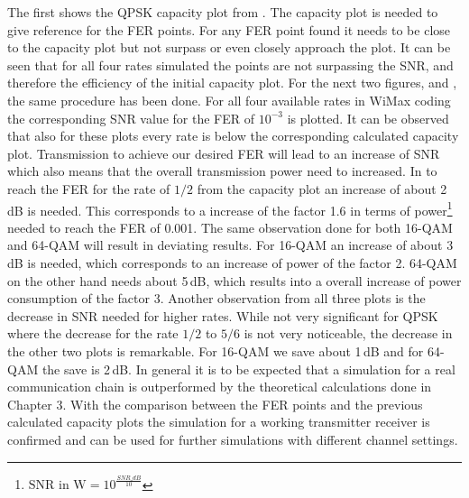 \newpage
The first  shows the QPSK capacity plot from . The capacity plot is needed to give reference for the \gls{FER} points. For any \gls{FER} point found it needs to be close to the capacity plot but not surpass or even closely approach the plot. It can be seen that for all four rates simulated the points are not surpassing the \gls{SNR}, and therefore the efficiency of the initial  capacity plot.
\newline
For the next two figures,  and , the same procedure has been done. For all four available rates in WiMax coding the corresponding SNR value for the \gls{FER} of $10^{-3}$ is plotted. It can be observed that also for these plots every rate is below the corresponding calculated capacity plot. Transmission to achieve our desired \gls{FER} will lead to an increase of \gls{SNR} which also means that the overall transmission power need to increased. In  to reach the \gls{FER} for the rate of $1/2$ from the capacity plot an increase of about 2\,dB is needed. This corresponds to a increase of the factor 1.6 in terms of power\footnote{$\textrm{SNR in W} = 10^{\frac{SNR\_dB}{10}}$} needed to reach the \gls{FER} of 0.001. The same observation done for both 16-QAM and 64-QAM will result in deviating results. For 16-QAM an increase of about 3\,dB is needed, which corresponds to an increase of power of the factor 2. 64-QAM on the other hand needs about 5\,dB, which results into a overall increase of power consumption of the factor 3.
\newline
Another observation from all three plots is the decrease in \gls{SNR} needed for higher rates. While not very significant for \gls{QPSK} where the decrease for the rate $1/2$ to $5/6$ is not very noticeable, the decrease in the other two plots is remarkable. For 16-QAM we save about 1\,dB and for 64-QAM the save is 2\,dB.
In general it is to be expected that a simulation for a real communication chain is outperformed by the theoretical calculations done in Chapter 3. With the comparison between the \gls{FER} points and the previous calculated capacity plots the simulation for a working transmitter receiver is confirmed and can be used for further simulations with different channel settings.




